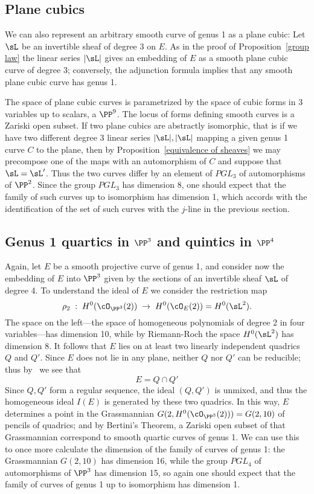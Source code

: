 \subsection{Plane cubics}

We can also represent an arbitrary smooth curve of genus 1 as a plane cubic:
Let $\sL$ be an invertible sheaf of degree 3 on $E$. As in the proof of Proposition~\ref{group law} the linear series $|\sL|$ gives an embedding of $E$ as a smooth plane cubic curve of degree 3; conversely, the adjunction formula implies that any smooth plane cubic curve has genus 1. 

The space of plane cubic curves is parametrized by the space of cubic forms in 3 variables up to 
scalars, a  $\PP^9$. The locus of forms defining smooth curves is a Zariski open subset. If two plane cubics are abstractly
isomorphic, that is if we have two different degree 3 linear series $|\sL|, |\sL|$ mapping a given genus 1 curve $C$ to the plane, then by
Proposition~\ref{equivalence of sheaves} we may  precompose one of the maps with an automorphism of $C$
and suppose that $\sL = \sL'$. Thus the two curves differ by an element of $PGL_3$ of automorphisms of $\PP^2$. Since the group $PGL_3$ has dimension 8, one should expect that the family of such curves up to isomorphism has dimension 1, which accords with the identification of the set of such
curves with the $j$-line in the previous section.



\subsection{Genus 1 quartics in $\PP^3$ and quintics in $\PP^4$} \label{g=1 in P3,P4}

Again, let $E$ be a smooth projective curve of genus 1, and consider now the embedding of $E$ into $\PP^3$ given by the sections of an invertible sheaf $\sL$ of degree 4. To understand the ideal of $E$ we consider the restriction map
$$
\rho_2 \;  : \; H^0(\cO_{\PP^3}(2)) \; \to \; H^0(\cO_{E}(2)) = H^0(\sL^2).
$$
The space on the left---the space of homogeneous polynomials of degree 2 in four variables---has dimension 10, while by Riemann-Roch the space $H^0(\sL^2)$ has dimension 8. It follows that $E$ lies on at least two linearly independent quadrics $Q$ and $Q'$. Since $E$ does not lie in any plane, neither $Q$ nor $Q'$ can be reducible; thus by \bt\ we see that
$$
E = Q \cap Q'
$$
Since $Q,Q'$ form a regular sequence, the ideal $(Q,Q')$ is unmixed, and thus the homogeneous ideal $I(E)$ is generated by
these two quadrics. In this way, $E$ determines a point in the Grassmannian $G(2, H^0(\cO_{\PP^3}(2))) = G(2, 10)$ of pencils of quadrics; and by Bertini's Theorem, a Zariski open subset of that Grassmannian correspond to smooth quartic curves of genus 1. We can use this to once more calculate the dimension of the family of curves of genus 1: the Grassmannian $G(2,10)$ has dimension 16, while the group $PGL_4$ of automorphisms of $\PP^3$ has dimension 15, so again one should expect that the family of curves of genus 1 up to isomorphism has dimension 1.

